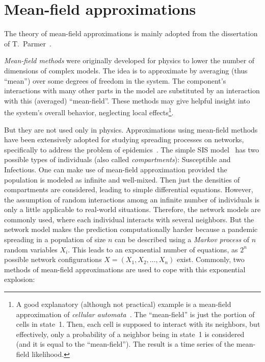 \documentclass[
	digital, oneside, nosansbold, nocolorbold, nolot, nolof
]{fithesis4}
\theoremstyle{definition}
\theoremstyle{definition}
\begin{document}
\section{Mean-field approximations}

The theory of mean-field approximations is mainly adopted from the dissertation
of T.~Parmer~\cite{parmer_phd}.

\emph{Mean-field methods} were originally developed for physics to lower the
number of dimensions of complex models. The idea is to approximate by averaging
(thus \enquote{mean}) over some degrees of freedom in the system. The
component's interactions with many other parts in the model are substituted by
an interaction with this (averaged) \enquote{mean-field}. These methods may
give helpful insight into the system's overall behavior, neglecting local
effects\footnote{A good explanatory (although not practical) example is a
    mean-field approximation of \emph{cellular automata}~\cite{mean_field_ca}.
    The \enquote{mean-field} is just the portion of cells in state~1. Then,
    each cell is supposed to interact with its neighbors, but effectively, only
    a probability of a neighbor being in state~1 is considered (and it is equal
    to the \enquote{mean-field}). The result is a time series of the
    mean-field likelihood.}.

But they are not used only in physics. Approximations using mean-field methods
have been extensively adopted for studying spreading processes on networks,
specifically to address the problem of epidemics~\cite{pastor_epidemic,
yang_epidemic}. The simple SIS model~\cite{sis} has two possible types of
individuals (also called \emph{compartments}): Susceptible and Infectious. One
can make use of mean-field approximation provided the population is modeled as
infinite and well-mixed.  Then just the densities of compartments are
considered, leading to simple differential equations. However, the assumption
of random interactions among an infinite number of individuals is only a little
applicable to real-world situations.  Therefore, the network models are
commonly used, where each individual interacts with several neighbors. But the
network model makes the prediction computationally harder because a pandemic
spreading in a population of size $n$ can be described using a \emph{Markov
process} of $n$ random variables $X_i$.  This leads to an exponential number of
equations, as $2^n$ possible network configurations $X = (X_1, X_2, \ldots,
X_n)$ exist. Commonly, two methods of mean-field approximations are used to
cope with this exponential explosion:
\end{document}
